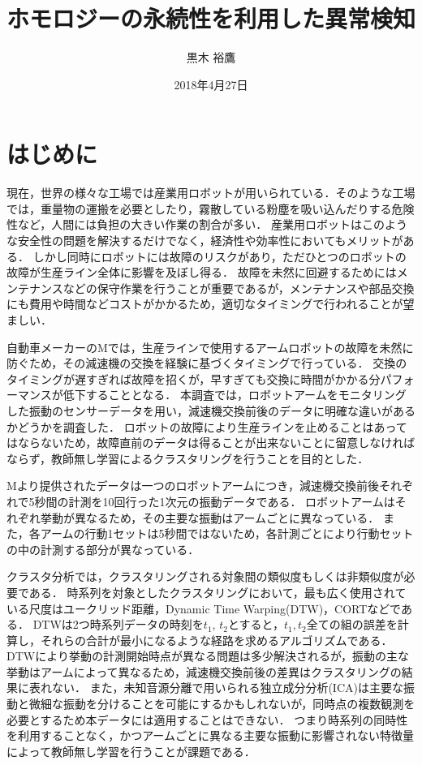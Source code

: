 \documentclass{jarticle}
\title{ホモロジーの永続性を利用した異常検知}
\author{黒木 裕鷹}
\date{2018年4月27日}
\begin{document}
\maketitle
\section{はじめに}
現在，世界の様々な工場では産業用ロボットが用いられている．そのような工場では，重量物の運搬を必要としたり，霧散している粉塵を吸い込んだりする危険性など，人間には負担の大きい作業の割合が多い．
産業用ロボットはこのような安全性の問題を解決するだけでなく，経済性や効率性においてもメリットがある．
しかし同時にロボットには故障のリスクがあり，ただひとつのロボットの故障が生産ライン全体に影響を及ぼし得る．
故障を未然に回避するためにはメンテナンスなどの保守作業を行うことが重要であるが，メンテナンスや部品交換にも費用や時間などコストがかかるため，適切なタイミングで行われることが望ましい．


自動車メーカーのMでは，生産ラインで使用するアームロボットの故障を未然に防ぐため，その減速機の交換を経験に基づくタイミングで行っている．
交換のタイミングが遅すぎれば故障を招くが，早すぎても交換に時間がかかる分パフォーマンスが低下することとなる．
本調査では，ロボットアームをモニタリングした振動のセンサーデータを用い，減速機交換前後のデータに明確な違いがあるかどうかを調査した．
ロボットの故障により生産ラインを止めることはあってはならないため，故障直前のデータは得ることが出来ないことに留意しなければならず，教師無し学習によるクラスタリングを行うことを目的とした．


Mより提供されたデータは一つのロボットアームにつき，減速機交換前後それぞれで5秒間の計測を10回行った1次元の振動データである．
ロボットアームはそれぞれ挙動が異なるため，その主要な振動はアームごとに異なっている．
また，各アームの行動1セットは5秒間ではないため，各計測ごとにより行動セットの中の計測する部分が異なっている．

クラスタ分析では，クラスタリングされる対象間の類似度もしくは非類似度が必要である．
時系列を対象としたクラスタリングにおいて，最も広く使用されている尺度はユークリッド距離，Dynamic Time Warping(DTW)，CORTなどである．
DTWは2つ時系列データの時刻を$t_1$, $t_2$とすると，$t_1,t_2$全ての組の誤差を計算し，それらの合計が最小になるような経路を求めるアルゴリズムである．
DTWにより挙動の計測開始時点が異なる問題は多少解決されるが，振動の主な挙動はアームによって異なるため，減速機交換前後の差異はクラスタリングの結果に表れない．
また，未知音源分離で用いられる独立成分分析(ICA)は主要な振動と微細な振動を分けることを可能にするかもしれないが，同時点の複数観測を必要とするため本データには適用することはできない．
つまり時系列の同時性を利用することなく，かつアームごとに異なる主要な振動に影響されない特徴量によって教師無し学習を行うことが課題である．
\end{document}
